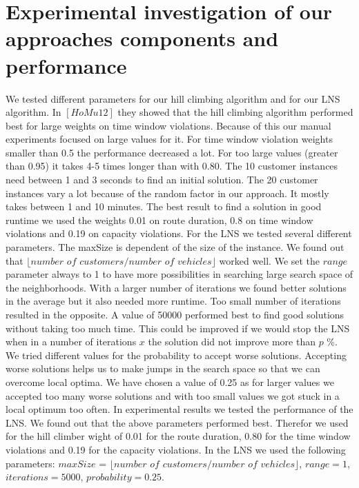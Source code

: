 \documentclass[fleqn]{scrartcl}
\begin{document}
\newpage
\section{Experimental investigation of our approaches components and performance}
We tested different parameters for our hill climbing algorithm and for our LNS algorithm. In $[HoMu 12]$ they showed that the hill climbing algorithm performed best for large weights on time window violations. Because of this our manual experiments focused on large values for it. For time window violation weights smaller than 0.5 the performance decreased a lot. For too large values (greater than 0.95) it takes 4-5 times longer than with 0.80. The 10 customer instances need between 1 and 3 seconds to find an initial solution. The 20 customer instances vary a lot because of the random factor in our approach. It mostly takes between 1 and 10 minutes. The best result to find a solution in good runtime we used the weights 0.01 on route duration, 0.8 on time window violations and 0.19 on capacity violations.
For the LNS we tested several different parameters. The maxSize is dependent of the size of the instance. We found out that $\lfloor$$number$ $of$ $customers / number$ $of$ $vehicles$$\rfloor$ worked well. We set the $range$ parameter always to 1 to have more possibilities in searching large search space of the neighborhoods. With a larger number of iterations we found better solutions in the average but it also needed more runtime. Too small number of iterations resulted in the opposite. A value of 50000 performed best to find good solutions without taking too much time. This could be improved if we would stop the LNS when in a number of iterations $x$ the solution did not improve more than $p$ \%. \\
We tried different values for the probability to accept worse solutions. Accepting worse solutions helps us to make jumps in the search space so that we can overcome local optima. We have chosen a value of 0.25 as for larger values we accepted too many worse solutions and with too small values we got stuck in a local optimum too often.
In experimental results we tested the performance of the LNS. We found out that the above parameters performed best. Therefor we used for the hill climber wight of 0.01 for the route duration, 0.80 for the time window violations and 0.19 for the capacity violations. In the LNS we used the following parameters: $maxSize$ = $\lfloor$$number$ $of$ $customers/number$ $of$ $vehicles$$\rfloor$, $range = 1$, $iterations = 5000$, $probability = 0.25$.\\
\end{document}
